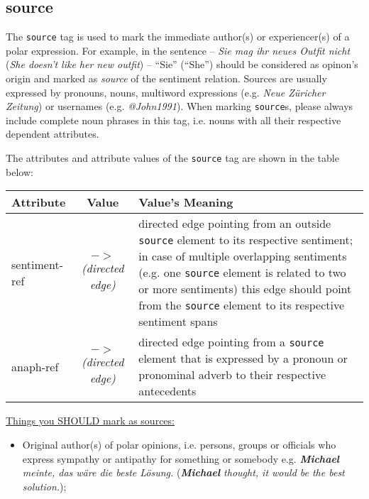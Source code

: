 \documentclass[11pt,a4paper]{article}
\begin{document}
\subsection{source}
The \texttt{source} tag is used to mark the immediate author(s) or
experiencer(s) of a polar expression.  For example, in the
sentence -- \textit{Sie mag ihr neues Outfit nicht} (\textit{She
  doesn't like her new outfit}) -- ``Sie'' (``She'') should be
considered as opinon's origin and marked as \textit{source} of the
sentiment relation.  Sources are usually expressed by pronouns, nouns, 
multiword expressions (e.g. \textit{Neue Z\"uricher Zeitung}) or usernames 
(e.g. \textit{@John1991}). 
When marking \texttt{source}s, please always include complete noun phrases 
in this tag, i.e. nouns with all their respective dependent attributes. 

The attributes and attribute values of the \texttt{source} tag are shown in the table below: \\

\begin{tabular}{|l|c|p{}|}\hline
  Attribute & Value & Value's Meaning\\\hline
  sentiment-ref & \textit{$->$\newline(directed edge)} & directed edge
  pointing from an outside \texttt{source} element to its respective sentiment;
  in case of multiple overlapping sentiments (e.g. one \texttt{source}
  element is related to two or more sentiments) this
  edge should point from the \texttt{source} element to its respective sentiment
  spans\\\hline

  anaph-ref & \textit{$->$\newline(directed edge)} & directed edge
  pointing from a \texttt{source} element that is expressed by a pronoun or pronominal
  adverb to their respective antecedents\\\hline
\end{tabular}
\vspace{0.5cm} 

\underline{Things you SHOULD mark as sources:}
\begin{itemize}
  \item Original author(s) of polar opinions, i.e. persons,
    groups or officials who express sympathy or antipathy for
    something or somebody e.g. \textit{\textbf{Michael} meinte, das w\"are die
      beste L\"osung.}  (\textit{\textbf{Michael} thought, it would be the
      best solution.});
\end{itemize}
\end{document}
